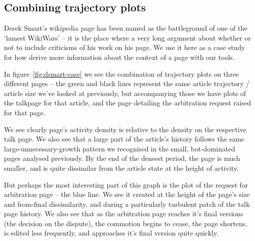 \subsection*{Combining trajectory plots}
Derek Smart's wikipedia page has been named as the battleground of one
of the `lamest WikiWars' -- it is the place where a very long argument
about whether or not to include criticisms of his work on his page.
We use it here as a case study for how derive more information about
the context of a page with our tools.

In figure~\ref{fig:dsmart-case} we see the combination of trajectory
plots on three different pages -- the green and black lines represent
the same article trajectory / article size we've looked at previously,
but accompanying those we have plots of the talkpage for that article,
and the page detailing the arbitration request raised for that page. 

We see clearly page's activity density is relative to the density on
the respective talk page. We also see that a large part of the
article's history follows the same large-unnecessary-growth pattern we
recognised in the small, bot-dominated pages analysed previously. By
the end of the densest period, the page is much smaller, and is
quite dissimilar from the article state at the height of activity.

But perhaps the most interesting part of this graph is the plot of the
request for arbitration page -- the blue line. We see it created at
the height of the page's size and from-final dissimilarity, and during
a particularly turbulent patch of the talk page history. We also see
that as the arbitration page reaches it's final versions (the decision
on the dispute), the commotion begins to cease, the page
shortens, is edited less frequently, and approaches it's final version
quite quickly.

